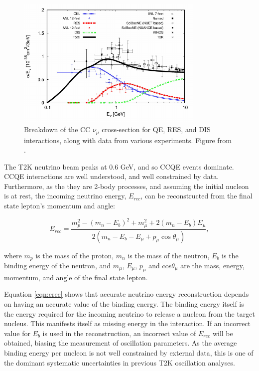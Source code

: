 \begin{figure}[!htbp]
\centering
\includegraphics*[width=0.8\textwidth,clip]{figs/xsections}
\caption{Breakdown of the CC $\nu_\mu$ cross-section for QE, RES, and DIS interactions, along with data from various experiments. Figure from \cite{nuxsec}.
} \label{xsecpot}
\end{figure}

The T2K neutrino beam peaks at 0.6 GeV, and so CCQE events dominate. CCQE interactions are well understood, and well constrained by data. Furthermore, as the they are 2-body processes, and assuming the initial nucleon is at rest, the incoming neutrino energy, $E_{rec}$, can be reconstructed from the final state lepton's momentum and angle:

\begin{equation}
E_{rec} = \frac{m_p^2 - (m_n - E_b)^2 + m_\mu^2 + 2(m_n - E_b)E_\mu}{2(m_n - E_b - E_\mu + p_\mu \cos \theta_\mu)},
\label{eqn:erec}
\end{equation}

where $m_p$ is the mass of the proton, $m_n$ is the mass of the neutron, $E_b$ is the binding energy of the neutron, and $m_\mu$, $E_\mu$, $p_\mu$ and cos$\theta_\mu$ are the mass, energy, momentum, and angle of the final state lepton.

Equation \ref{eqn:erec} shows that accurate neutrino energy reconstruction depends on having an accurate value of the binding energy. The binding energy itself is the energy required for the incoming neutrino to release a nucleon from the target nucleus. This manifests itself as missing energy in the interaction. If an incorrect value for $E_b$ is used in the reconstruction, an incorrect value of $E_{rec}$ will be obtained, biasing the measurement of oscillation parameters. As the average binding energy per nucleon is not well constrained by external data, this is one of the dominant systematic uncertainties in previous T2K oscillation analyses.

